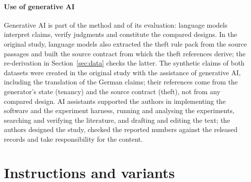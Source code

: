 \paragraph{Use of generative AI}
Generative AI is part of the method and of its evaluation: language models interpret claims, verify judgments and constitute the compared designs. In the original study, language models also extracted the theft rule pack from the source passages and built the source contract from which the theft references derive; the re-derivation in Section~\ref{sec:data} checks the latter. The synthetic claims of both datasets were created in the original study with the assistance of generative AI, including the translation of the German claims; their references come from the generator's state (tenancy) and the source contract (theft), not from any compared design. AI assistants supported the authors in implementing the software and the experiment harness, running and analysing the experiments, searching and verifying the literature, and drafting and editing the text; the authors designed the study, checked the reported numbers against the released records and take responsibility for the content.

\section{Instructions and variants}
\label{app:instructions}

